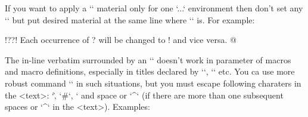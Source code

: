 \new
If you want to apply a `\tthook` material only for one `\begtt...\endtt`
environment then don't set any `\tthook` but put desired material at the 
same line where `\begtt` is. For example:

\begtt   \adef@{\string\endtt}
\begtt   \adef!{?}\adef?{!}
Each occurrence of ? will be changed to ! and vice versa. 
@
\endtt

The in-line verbatim surrounded by an `\activettchar` doesn't work in
parameter of macros and macro definitions, especially in titles declared by
`\chap`, `\sec` etc. 
\new
You ca use more robust command `` in such
situations, but you must escape following charaters in the <text>:
`\`, `#`, `%
and space or `^` (if there are more than one subsequent spaces or `^` in 
the <text>). Examples:

